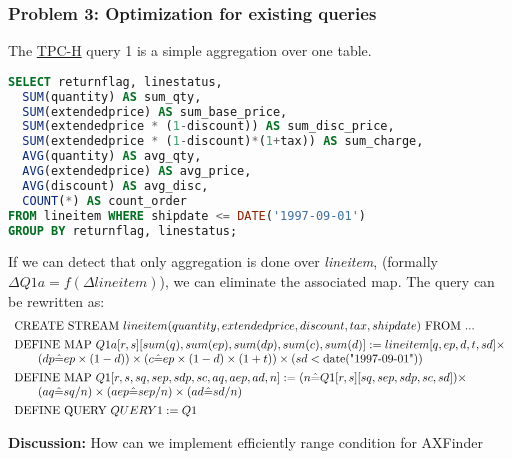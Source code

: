 \documentclass[11pt]{article}
\newlength{\dlen}
\def\discuss#1{\par\hspace{2em}
\setlength{\dlen}{\textwidth}
\addtolength{\dlen}{-2em}
\begin{minipage}{\dlen}\footnotesize {\bf\color{red} Discussion:} #1\end{minipage}\par}
\begin{document}
\subsubsection*{Problem 3: Optimization for existing queries}
The \href{http://www.tpc.org/tpch/spec/tpch2.16.0.pdf}{TPC-H} query 1 is a simple aggregation over one table.
\begin{lstlisting}[language=sql]
SELECT returnflag, linestatus, 
  SUM(quantity) AS sum_qty,
  SUM(extendedprice) AS sum_base_price,
  SUM(extendedprice * (1-discount)) AS sum_disc_price,
  SUM(extendedprice * (1-discount)*(1+tax)) AS sum_charge,
  AVG(quantity) AS avg_qty,
  AVG(extendedprice) AS avg_price,
  AVG(discount) AS avg_disc,
  COUNT(*) AS count_order
FROM lineitem WHERE shipdate <= DATE('1997-09-01')
GROUP BY returnflag, linestatus;
\end{lstlisting}
If we can detect that only aggregation is done over {\it lineitem}, (formally $\Delta Q1a=f(\Delta lineitem)$), we can eliminate the associated map. The query can be rewritten as:
\[\begin{array}{l}
\text{CREATE STREAM }lineitem(quantity,extendedprice,discount,tax,shipdate)\text{ FROM }...\vspace{4pt}\\
\text{DEFINE MAP }Q1a[r,s][sum(q),sum(ep),sum(dp),sum(c),sum(d)] := lineitem[q,ep,d,t,sd] \times\\
\qquad (dp \hat= ep\times(1-d)) \times (c \hat= ep\times(1-d)\times(1+t)) \times (sd < \text{date("1997-09-01")})\vspace{4pt}\\
\text{DEFINE MAP }Q1[r,s,sq,sep,sdp,sc,aq,aep,ad,n] := (n \hat= Q1[r,s][sq,sep,sdp,sc,sd]) \times\\
\qquad (aq \hat= sq/n) \times (aep \hat= sep/n) \times (ad \hat= sd/n)\vspace{4pt}\\
\text{DEFINE QUERY }QUERY1 := Q1
\end{array}\]

\discuss{How can we implement efficiently range condition for AXFinder}

\end{document}
